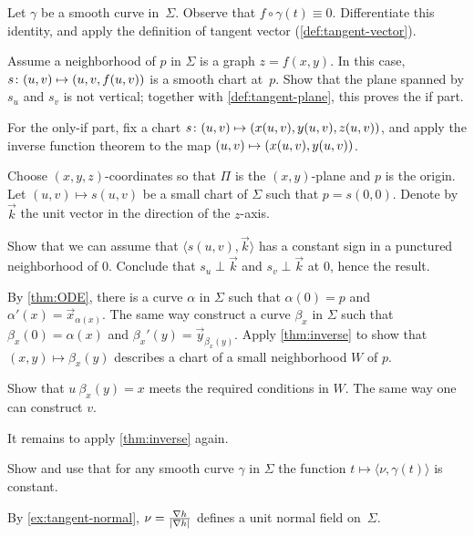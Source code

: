 \begin{multicols}{2}

\setcounter{eqtn}{0}

Let $\gamma$ be a smooth curve in~$\Sigma$.
Observe that $f\circ\gamma(t)\equiv 0$.
Differentiate this identity, and apply the definition of tangent vector (\ref{def:tangent-vector}).

Assume a neighborhood of $p$ in $\Sigma$ is a graph $z=f(x,y)$.
In this case, $s\:(u,v)\z\mapsto (u,v,f(u,v))$ is a smooth chart at~$p$.
Show that the plane spanned by $s_u$ and $s_v$ is not vertical;
together with \ref{def:tangent-plane}, this proves the if part.

For the only-if part, fix a chart 
$s\:(u,v)\z\mapsto(x(u,v),y(u,v),z(u,v))$,
and apply the inverse function theorem to the map $(u,v)\z\mapsto(x(u,v),y(u,v))$.

Choose $(x,y,z)$-coordinates so that $\Pi$ is the $(x,y)$-plane and $p$ is the origin.
Let $(u,v)\mapsto s(u,v)$ be a small chart of $\Sigma$ such that $p=s(0,0)$.
Denote by $\vec k$ the unit vector in the direction of the $z$-axis.

Show that we can assume that $\langle s(u,v),\vec k\rangle$ has a constant sign in a punctured neighborhood of $0$.
Conclude that $s_u\perp \vec k$ and $s_v\perp \vec k$ at
$0$, hence the result.

By \ref{thm:ODE}, there is a curve $\alpha$ in $\Sigma$ such that $\alpha(0)=p$ and $\alpha'(x)=\vec x_{\alpha(x)}$.
The same way construct a curve $\beta_x$ in $\Sigma$ such that $\beta_x(0)=\alpha(x)$ and $\beta_x'(y)=\vec y_{\beta_x(y)}$.
Apply \ref{thm:inverse} to show that $(x,y)\mapsto \beta_x(y)$ describes a chart of a small neighborhood $W$ of $p$.

Show that $u\:\beta_x(y)= x$ meets the required conditions in $W$.
The same way one can construct $v$.

It remains to apply \ref{thm:inverse} again.

Show and use that for any smooth curve $\gamma$ in $\Sigma$ the function $t\mapsto \langle\nu,\gamma(t)\rangle$ is constant.

By \ref{ex:tangent-normal}, $\nu=\tfrac{\nabla h}{|\nabla h|}$ defines a unit normal field on~$\Sigma$.


\end{multicols}
